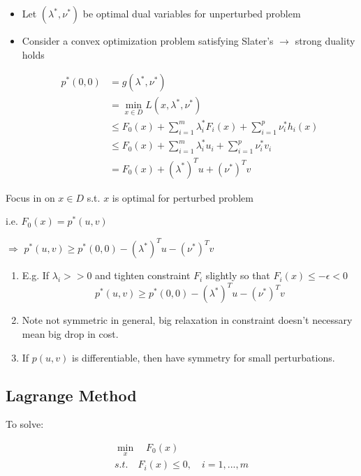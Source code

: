 \begin{itemize}
	\item Let $(\lambda^*, \nu^*)$ be optimal dual variables for unperturbed problem
	
	\item Consider a convex optimization problem satisfying Slater's $\rightarrow$ strong duality holds
	
	\begin{align*}
	p^*(0,0) &= g(\lambda^*, \nu^*)\\
	&= \min_{x\in D} L(x, \lambda^*, \nu^*)\\
	&\leq F_0(x) + \sum^m_{i=1}\lambda_i^* F_i(x) + \sum^p_{i=1}\nu_i^* h_i(x)\\
	&\leq F_0(x) + \sum^m_{i=1}\lambda_i^* u_i + \sum^p_{i=1}\nu^*_iv_i\\
	&= F_0(x) + (\lambda^*)^Tu+(\nu^*)^Tv
	\end{align*}
\end{itemize}
Focus in on $x\in D$ s.t. $x$ is optimal for perturbed problem

i.e. $F_0(x)=p^*(u,v)$

$\Rightarrow$ $p^*(u,v) \geq p^*(0,0) - (\lambda^*)^Tu - (\nu^*)^Tv$

\begin{enumerate}
	\item E.g. If $\lambda_i >> 0$ and tighten constraint $F_i$ slightly so that $F_i(x)\leq -\epsilon < 0$\\
	
	\begin{equation*}
	p^*(u,v)\geq p^*(0,0) - (\lambda^*)^Tu - (\nu^*)^Tv
	\end{equation*}
	
	\item Note not symmetric in general, big relaxation in constraint doesn't necessary mean big drop in cost.
	
	\item If $p(u,v)$ is differentiable, then have symmetry for small perturbations. 
\end{enumerate}

\subsection{Lagrange Method}
To solve:

\begin{align*}
\min_x\quad F_0(x)\\
s.t. \quad F_i(x) \leq 0,\quad i = 1,...,m
\end{align*}

